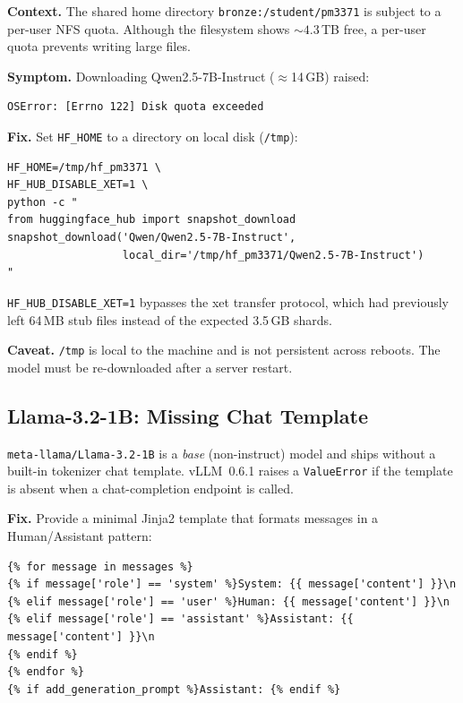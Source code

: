 \documentclass[11pt,a4paper]{article}
\begin{document}
\textbf{Context.}
The shared home directory \texttt{bronze:/student/pm3371} is subject to a
per-user NFS quota.
Although the filesystem shows $\sim4.3$\,TB free, a per-user quota prevents
writing large files.

\textbf{Symptom.}
Downloading Qwen2.5-7B-Instruct ($\approx$14\,GB) raised:
\begin{lstlisting}[style=shell]
OSError: [Errno 122] Disk quota exceeded
\end{lstlisting}

\textbf{Fix.}
Set \texttt{HF\_HOME} to a directory on local disk (\texttt{/tmp}):
\begin{lstlisting}[style=shell]
HF_HOME=/tmp/hf_pm3371 \
HF_HUB_DISABLE_XET=1 \
python -c "
from huggingface_hub import snapshot_download
snapshot_download('Qwen/Qwen2.5-7B-Instruct',
                  local_dir='/tmp/hf_pm3371/Qwen2.5-7B-Instruct')
"
\end{lstlisting}

\texttt{HF\_HUB\_DISABLE\_XET=1} bypasses the xet transfer protocol, which
had previously left 64\,MB stub files instead of the expected 3.5\,GB shards.

\textbf{Caveat.}
\texttt{/tmp} is local to the machine and is not persistent across reboots.
The model must be re-downloaded after a server restart.

\subsection{Llama-3.2-1B: Missing Chat Template}
\label{sec:chat_template}

\texttt{meta-llama/Llama-3.2-1B} is a \emph{base} (non-instruct) model and
ships without a built-in tokenizer chat template.
vLLM~0.6.1 raises a \texttt{ValueError} if the template is absent when a
chat-completion endpoint is called.

\textbf{Fix.}
Provide a minimal Jinja2 template that formats messages in a
Human/Assistant pattern:
\begin{lstlisting}[style=shell, caption={Minimal chat template (\texttt{llama\_base\_chat\_template.jinja}).}]
{% for message in messages %}
{% if message['role'] == 'system' %}System: {{ message['content'] }}\n
{% elif message['role'] == 'user' %}Human: {{ message['content'] }}\n
{% elif message['role'] == 'assistant' %}Assistant: {{ message['content'] }}\n
{% endif %}
{% endfor %}
{% if add_generation_prompt %}Assistant: {% endif %}
\end{lstlisting}
\end{document}
